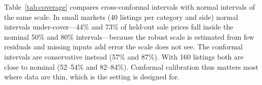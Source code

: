 Table~\ref{tab:coverage} compares cross-conformal intervals with normal intervals of the same
scale. In small markets (40 listings per category and side) normal intervals under-cover---44\% and
73\% of held-out sale prices fall inside the nominal 50\% and 80\% intervals---because the robust
scale is estimated from few residuals and missing inputs add error the scale does not see. The
conformal intervals are conservative instead (57\% and 87\%). With 160 listings both are close to
nominal (52--54\% and 82--84\%). Conformal calibration thus matters most where data are thin, which
is the setting \sherpa{} is designed for.
